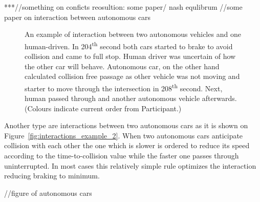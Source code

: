 \documentclass[11pt,english]{article}
\begin{document}
***//something on conficts reosultion: some paper/ nash equlibrum
//some paper on interaction between autonomous cars



\begin{figure}[!] %
\caption{An example of interaction between two autonomous vehicles and one human-driven. In 204\textsuperscript{th} second both cars started to brake to avoid collision and came to full stop. Human driver was uncertain of how the other car will behave. Autonomous car, on the other hand calculated collision free passage as other vehicle was not moving and starter to move through the intersection in 208\textsuperscript{th} second. Next, human passed through and another autonomous vehicle afterwards. (Colours indicate current order from Participant.)}
\label{fig:interactions_example_1v2}
\end{figure}

Another type are interactions between two autonomous cars as it is shown on Figure~\ref{fig:interactions_example_2}. When two autonomous cars anticipate collision with each other the one which is slower is ordered to reduce its speed according to the time-to-collision value while the faster one passes through uninterrupted. In most cases this relatively simple rule optimizes the interaction reducing braking to minimum.  





//figure of autonomous cars
\end{document}
